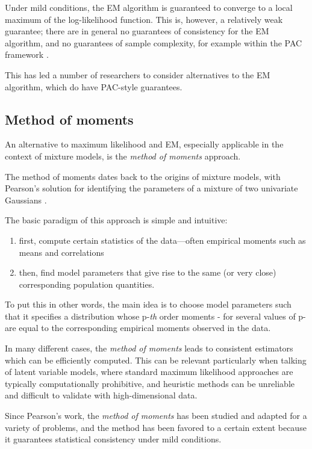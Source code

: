 Under mild conditions,
the EM algorithm is guaranteed to converge to a local maximum of the log-likelihood
function. This is, however, a relatively weak guarantee; there are in general no guarantees
of consistency for the EM algorithm, and no guarantees of sample complexity, for example
within the PAC framework \cite{ref19}. 

This has led a number of researchers to consider
alternatives to the EM algorithm, which do have PAC-style guarantees.






\subsection{Method of moments}

An alternative to maximum likelihood and EM, especially applicable in the context of mixture models,
is the \textit{method of moments} approach.

The method of moments dates back to the origins of mixture
models, with Pearson’s solution for identifying the parameters of a mixture of two univariate
Gaussians \cite{ref5}. 

The basic paradigm of this approach is simple and intuitive:
\begin{enumerate}[label=\roman*]
\item first, compute certain statistics of the data—often empirical moments such as means and correlations
\item then, find model parameters that give rise to the same (or very close) corresponding population quantities.
\end{enumerate}

To put this in other words, the main idea is to choose model parameters such that it specifies a distribution whose p-\textit{th} order moments - for several values of p- are equal to the corresponding empirical moments observed in the data.

In many different cases, the \textit{method of moments} leads to consistent estimators which can be efficiently computed. This can be relevant particularly when talking of latent variable models, where standard maximum likelihood approaches are typically computationally prohibitive, and heuristic methods can be unreliable and difficult to validate with high-dimensional data. 


Since Pearson’s work, the \textit{method of moments} has been studied
and adapted for a variety of problems, and the method has been favored to a certain extent because it guarantees statistical consistency under mild conditions.

